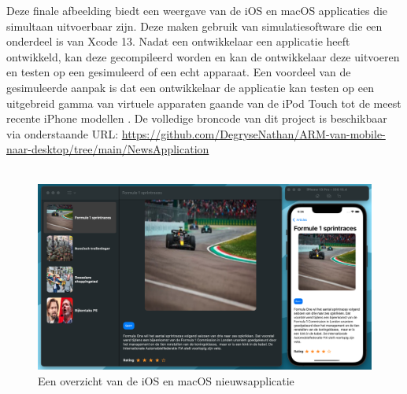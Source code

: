\pagebreak
Deze finale afbeelding biedt een weergave van de iOS en macOS applicaties die simultaan uitvoerbaar zijn. Deze maken gebruik van simulatiesoftware die een onderdeel is van Xcode 13. Nadat een ontwikkelaar een applicatie heeft ontwikkeld, kan deze gecompileerd worden en kan de ontwikkelaar deze uitvoeren en testen op een gesimuleerd of een echt apparaat. Een voordeel van de gesimuleerde aanpak is dat een ontwikkelaar de applicatie kan testen op een uitgebreid gamma van virtuele apparaten gaande van de iPod Touch tot de meest recente iPhone modellen \autocite{AppleDeveloper2021}. De volledige broncode van dit project is beschikbaar via onderstaande URL: \url{https://github.com/DegryseNathan/ARM-van-mobile-naar-desktop/tree/main/NewsApplication}
\\\\
\begin{figure}[!h]
    \centering
    \includegraphics[width=\linewidth]{img/iosenmacosapplicatie.png}
    \caption{Een overzicht van de iOS en macOS nieuwsapplicatie}
\end{figure}
